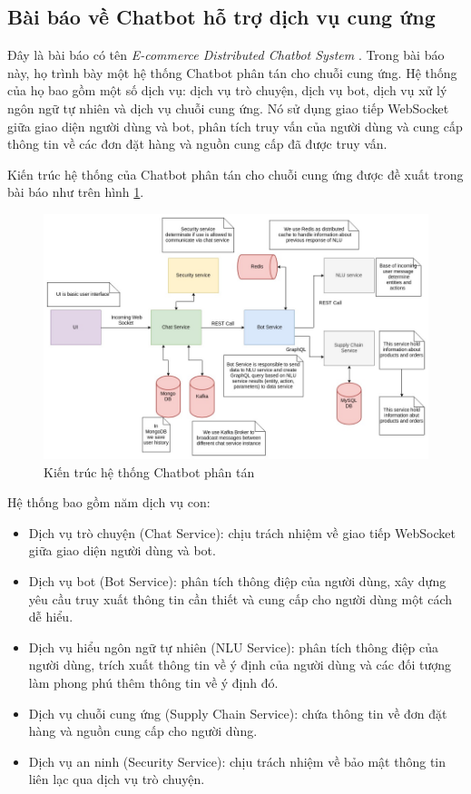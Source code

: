\subsection{Bài báo về Chatbot hỗ trợ dịch vụ cung ứng}
Đây là bài báo có tên \textit{E-commerce Distributed Chatbot System}
\cite{commerce}. Trong bài báo này, họ trình bày một hệ thống Chatbot
phân tán cho chuỗi cung ứng. Hệ thống của họ bao gồm một số dịch vụ:
dịch vụ trò chuyện, dịch vụ bot, dịch vụ xử lý ngôn ngữ tự nhiên và
dịch vụ chuỗi cung ứng. Nó sử dụng giao tiếp WebSocket giữa giao diện
người dùng và bot, phân tích truy vấn của người dùng và cung cấp
thông tin về các đơn đặt hàng và nguồn cung cấp đã được truy vấn.

Kiến trúc hệ thống của Chatbot phân tán cho chuỗi cung ứng được
đề xuất trong bài báo như trên hình \ref{fig:commerce}.

\begin{figure}[ht]
    \centering
    \includegraphics[width=1\textwidth]{thesis/chatbot/congtrinh/img/commerce.png}
    \caption{Kiến trúc hệ thống Chatbot phân tán}
    \label{fig:commerce}
\end{figure}

Hệ thống bao gồm năm dịch vụ con:
\begin{itemize}
    \item Dịch vụ trò chuyện (Chat Service): chịu trách nhiệm về
    giao tiếp WebSocket giữa giao diện người dùng và bot.
    \item Dịch vụ bot (Bot Service): phân tích thông điệp của
    người dùng, xây dựng yêu cầu truy xuất thông tin cần thiết
    và cung cấp cho người dùng một cách dễ hiểu.
    \item Dịch vụ hiểu ngôn ngữ tự nhiên (NLU Service): phân tích
    thông điệp của người dùng, trích xuất thông tin về ý định của
    người dùng và các đối tượng làm phong phú thêm thông tin về
    ý định đó.
    \item Dịch vụ chuỗi cung ứng (Supply Chain Service): chứa
    thông tin về đơn đặt hàng và nguồn cung cấp cho người dùng.
    \item Dịch vụ an ninh (Security Service): chịu trách nhiệm
    về bảo mật thông tin liên lạc qua dịch vụ trò chuyện.
\end{itemize}

